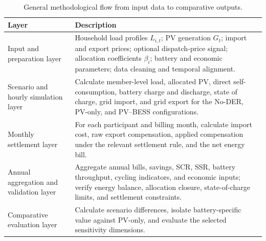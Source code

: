 \begin{table}[htbp]
\centering
\caption{General methodological flow from input data to comparative outputs.}
\label{tab:ch3_model_flow}
\small
\begin{tabular}{p{}p{}}
\toprule
\textbf{Layer} & \textbf{Description} \\
\midrule
Input and preparation layer & Household load profiles $L_{i,t}$; PV generation $G_t$; import and export prices; optional dispatch-price signal; allocation coefficients $\beta_i$; battery and economic parameters; data cleaning and temporal alignment. \\
Scenario and hourly simulation layer & Calculate member-level load, allocated PV, direct self-consumption, battery charge and discharge, state of charge, grid import, and grid export for the No-DER, PV-only, and PV--BESS configurations. \\
Monthly settlement layer & For each participant and billing month, calculate import cost, raw export compensation, applied compensation under the relevant settlement rule, and the net energy bill. \\
Annual aggregation and validation layer & Aggregate annual bills, savings, SCR, SSR, battery throughput, cycling indicators, and economic inputs; verify energy balance, allocation closure, state-of-charge limits, and settlement constraints. \\
Comparative evaluation layer & Calculate scenario differences, isolate battery-specific value against PV-only, and evaluate the selected sensitivity dimensions. \\
\bottomrule
\end{tabular}
\end{table}

